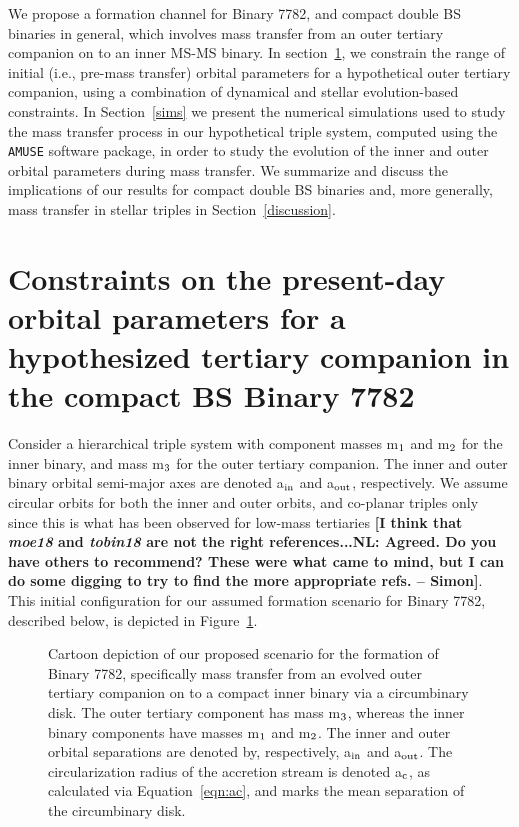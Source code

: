 \documentclass{aastex62}
\def\simon#1{{\bf {\color{red}[#1 -- Simon]}}}
\begin{document}
We propose a formation channel for Binary 7782, and compact double BS
binaries in general, which involves mass transfer from an outer
tertiary companion on to an inner MS-MS binary.  In section~\ref{dyn},
we constrain the range of initial (i.e., pre-mass transfer) orbital
parameters for a hypothetical outer tertiary companion, using a
combination of dynamical and stellar evolution-based constraints.  In
Section~\ref{sims} we present the numerical simulations used to study
the mass transfer process in our hypothetical triple system, computed
using the \texttt{AMUSE}\cite{AMUSE} software package, in order to
study the evolution of the inner and outer orbital parameters during
mass transfer.  We summarize and discuss the implications of our
results for compact double BS binaries and, more generally, mass
transfer in stellar triples in Section~\ref{discussion}.

\section{Constraints on the present-day orbital parameters for a hypothesized tertiary companion in the compact BS Binary 7782} \label{dyn}

Consider a hierarchical triple system with component masses m$_{\rm
  1}$ and m$_{\rm 2}$ for the inner binary, and mass m$_{\rm 3}$ for
the outer tertiary companion.  The inner and outer binary orbital
semi-major axes are denoted a$_{\rm in}$ and a$_{\rm out}$,
respectively.  We assume circular orbits for both the inner and outer
orbits, and co-planar triples only since this is what has been
observed for low-mass tertiaries \cite{2010yCat..73890925T} \simon{I
  think that {\em moe18} and {\em tobin18} are not the right
  references...NL:  Agreed.  Do you have others to recommend?  These were what came to mind, but 
  I can do some digging to try to find the more appropriate refs.}.  This initial configuration for our assumed formation
scenario for Binary 7782, described below, is depicted in
Figure~\ref{fig:fig1}.

\begin{figure}[ht!]
\caption{Cartoon depiction of our proposed scenario for the formation
  of Binary 7782, specifically mass transfer from an evolved outer
  tertiary companion on to a compact inner binary via a circumbinary
  disk.  The outer tertiary component has mass m$_{\rm 3}$, whereas
  the inner binary components have masses m$_{\rm 1}$ and m$_{\rm 2}$.
  The inner and outer orbital separations are denoted by,
  respectively, a$_{\rm in}$ and a$_{\rm out}$.  The circularization
  radius of the accretion stream is denoted a$_{\rm c}$, as calculated
  via Equation~\ref{eqn:ac}, and marks the mean separation of the
  circumbinary disk.
\label{fig:fig1}}
\end{figure}
\end{document}
